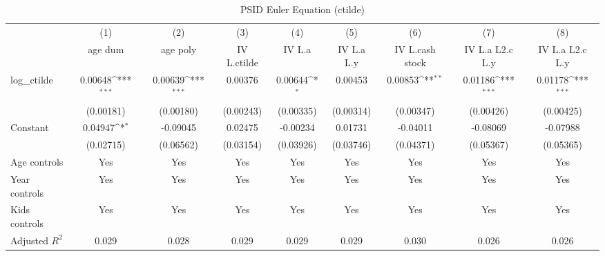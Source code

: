 {
\def\sym#1{\ifmmode^{#1}\else\(^{#1}\)\fi}
\begin{longtable}{l*{8}{c}}
\caption{PSID Euler Equation (ctilde)}\\
\toprule\endfirsthead\midrule\endhead\midrule\endfoot\endlastfoot
                    &\multicolumn{1}{c}{(1)}&\multicolumn{1}{c}{(2)}&\multicolumn{1}{c}{(3)}&\multicolumn{1}{c}{(4)}&\multicolumn{1}{c}{(5)}&\multicolumn{1}{c}{(6)}&\multicolumn{1}{c}{(7)}&\multicolumn{1}{c}{(8)}\\
                    &\multicolumn{1}{c}{age dum}&\multicolumn{1}{c}{age poly}&\multicolumn{1}{c}{IV L.ctilde}&\multicolumn{1}{c}{IV L.a}&\multicolumn{1}{c}{IV L.a L.y}&\multicolumn{1}{c}{IV L.cash stock}&\multicolumn{1}{c}{IV L.a L2.c L.y}&\multicolumn{1}{c}{IV L.a L2.c L.y}\\
\midrule
log\_ctilde          &     0.00648\sym{***}&     0.00639\sym{***}&     0.00376         &     0.00644\sym{*}  &     0.00453         &     0.00853\sym{**} &     0.01186\sym{***}&     0.01178\sym{***}\\
                    &   (0.00181)         &   (0.00180)         &   (0.00243)         &   (0.00335)         &   (0.00314)         &   (0.00347)         &   (0.00426)         &   (0.00425)         \\
\addlinespace
Constant            &     0.04947\sym{*}  &    -0.09045         &     0.02475         &    -0.00234         &     0.01731         &    -0.04011         &    -0.08069         &    -0.07988         \\
                    &   (0.02715)         &   (0.06562)         &   (0.03154)         &   (0.03926)         &   (0.03746)         &   (0.04371)         &   (0.05367)         &   (0.05365)         \\
\addlinespace
Age controls        &         Yes         &         Yes         &         Yes         &         Yes         &         Yes         &         Yes         &         Yes         &         Yes         \\
\addlinespace
Year controls       &         Yes         &         Yes         &         Yes         &         Yes         &         Yes         &         Yes         &         Yes         &         Yes         \\
\addlinespace
Kids controls       &         Yes         &         Yes         &         Yes         &         Yes         &         Yes         &         Yes         &         Yes         &         Yes         \\
\midrule
Adjusted \(R^{2}\)  &       0.029         &       0.028         &       0.029         &       0.029         &       0.029         &       0.030         &       0.026         &       0.026         \\

\end{longtable}}
